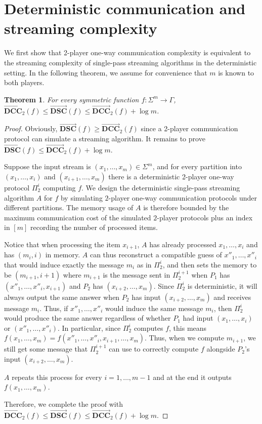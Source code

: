 \documentclass[11pt]{article}
\numberwithin{equation}{section}
\newtheorem{theorem}{Theorem}[section]
\theoremstyle{definition}
\theoremstyle{plain}
\newcommand{\alphabet}{\ensuremath{\Sigma}}
\newcommand{\range}{\ensuremath{\Gamma}}
\newcommand{\dccone}{\ensuremath{\overrightarrow{\mathbf{DCC}}}}
\newcommand{\dscone}{\ensuremath{\overrightarrow{\mathbf{DSC}}}}
\begin{document}
%
%



\section{Deterministic communication and streaming complexity}

We first show that 2-player one-way communication complexity is equivalent to the streaming complexity of single-pass streaming algorithms in the deterministic setting. In the following theorem, we assume for convenience that $m$ is known to both players.

\begin{theorem}\label{thm:dsc-dcc}
For every symmetric function $f:\alphabet^m\to \range$, $\dccone_2(f)\le \dscone(f)\le \dccone_2(f) + \log m$.
\end{theorem}
\begin{proof}
Obviously, $\dscone(f) \ge \dccone_2(f)$ since a 2-player communication protocol can simulate a streaming algorithm.
It remains to prove $\dscone(f) \le \dccone_2(f) + \log m$.

Suppose the input stream is $(x_1,\dots,x_m)\in\alphabet^m$,
and for every partition into $(x_1,\dots, x_i)$ and $(x_{i+1},\dots,x_m)$ there is a deterministic 2-player one-way  protocol $\Pi_2^i$ computing $f$.
We design the deterministic single-pass streaming algorithm $A$ for $f$ by simulating $2$-player one-way communication protocols under different partitions. 
The memory usage of $A$ is therefore bounded by the maximum communication cost of the simulated $2$-player protocols plus an index in $[m]$ recording the number of processed items.

Notice that when processing the item $x_{i+1}$, $A$ has already processed $x_1,\dots, x_i$ and has $(m_i,i)$ in memory. 
$A$ can thus reconstruct a compatible guess of $x''_1,\dots, x''_i$ that would induce exactly the message $m_i$ as in $\Pi_2^i$, and then sets the memory to be $(m_{i+1},i+1)$ where $m_{i+1}$ is the message sent in $\Pi_2^{i+1}$ when $P_1$ has $(x''_1,\dots, x''_i, x_{i+1})$ and $P_2$ has $(x_{i+2},\dots, x_m)$. {\color{black}Since $\Pi_2^i$ is deterministic, it will always output the same answer when $P_2$ has input $(x_{i+2}, \dots, x_m)$ and receives message $m_i$. Thus, if $x''_1, \dots, x''_i$ would induce the same message $m_i$, then $\Pi_2^i$ would produce the same answer regardless of whether $P_1$ had input $(x_1, \dots, x_i)$ or $(x''_1, \dots, x''_i)$. In particular, since $\Pi_2^i$ computes $f$, this means $f(x_1, \dots, x_m) = f(x''_1, \dots, x''_i, x_{i+1}, \dots, x_m)$. Thus, when we compute $m_{i+1}$, we still get some message that $\Pi^{i+1}_2$ can use to correctly compute $f$ alongside $P_2$'s input $(x_{i+2}, \dots, x_m)$.}

$A$ repeats this process for every $i=1,\dots,m-1$ and at the end it outputs $f(x_1,\dots,x_m)$.


Therefore, we complete the proof with $\dccone_2(f)\le \dscone(f) \le \dccone_2(f)+\log m$.
\end{proof}
\end{document}
